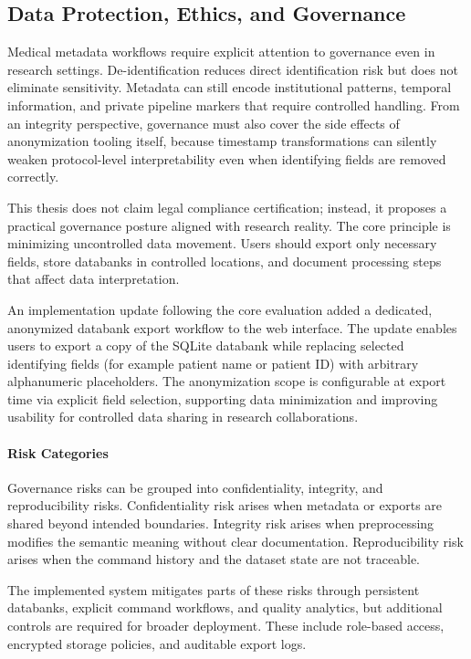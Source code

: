 \subsection{Data Protection, Ethics, and Governance}
Medical metadata workflows require explicit attention to governance even in research settings. De-identification reduces direct identification risk but does not eliminate sensitivity. Metadata can still encode institutional patterns, temporal information, and private pipeline markers that require controlled handling.
From an integrity perspective, governance must also cover the side effects of anonymization tooling itself, because timestamp transformations can silently weaken protocol-level interpretability even when identifying fields are removed correctly.

This thesis does not claim legal compliance certification; instead, it proposes a practical governance posture aligned with research reality. The core principle is minimizing uncontrolled data movement. Users should export only necessary fields, store databanks in controlled locations, and document processing steps that affect data interpretation.

An implementation update following the core evaluation added a dedicated, anonymized databank export workflow to the web interface. The update enables users to export a copy of the SQLite databank while replacing selected identifying fields (for example patient name or patient ID) with arbitrary alphanumeric placeholders. The anonymization scope is configurable at export time via explicit field selection, supporting data minimization and improving usability for controlled data sharing in research collaborations.

\paragraph{Risk Categories}
Governance risks can be grouped into confidentiality, integrity, and reproducibility risks. Confidentiality risk arises when metadata or exports are shared beyond intended boundaries. Integrity risk arises when preprocessing modifies the semantic meaning without clear documentation. Reproducibility risk arises when the command history and the dataset state are not traceable.

The implemented system mitigates parts of these risks through persistent databanks, explicit command workflows, and quality analytics, but additional controls are required for broader deployment. These include role-based access, encrypted storage policies, and auditable export logs.

